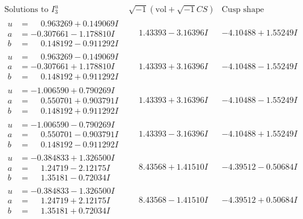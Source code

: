 \documentclass[1p]{elsarticle_modified}
\theoremstyle{definition}
\newcommand{\I}{\sqrt{-1}}
\begin{document}
$$\begin{array}{c|c|c}  
\text{Solutions to }I^u_{3}& \I (\text{vol} + \sqrt{-1}CS) & \text{Cusp shape}\\
 \hline 
\begin{aligned}
u &= \phantom{-}0.963269 + 0.149069 I \\
a &= -0.307661 - 1.178810 I \\
b &= \phantom{-}0.148192 - 0.911292 I\end{aligned}
 & \phantom{-}1.43393 - 3.16396 I & -4.10488 + 1.55249 I \\ \hline\begin{aligned}
u &= \phantom{-}0.963269 - 0.149069 I \\
a &= -0.307661 + 1.178810 I \\
b &= \phantom{-}0.148192 + 0.911292 I\end{aligned}
 & \phantom{-}1.43393 + 3.16396 I & -4.10488 - 1.55249 I \\ \hline\begin{aligned}
u &= -1.006590 + 0.790269 I \\
a &= \phantom{-}0.550701 + 0.903791 I \\
b &= \phantom{-}0.148192 + 0.911292 I\end{aligned}
 & \phantom{-}1.43393 + 3.16396 I & -4.10488 - 1.55249 I \\ \hline\begin{aligned}
u &= -1.006590 - 0.790269 I \\
a &= \phantom{-}0.550701 - 0.903791 I \\
b &= \phantom{-}0.148192 - 0.911292 I\end{aligned}
 & \phantom{-}1.43393 - 3.16396 I & -4.10488 + 1.55249 I \\ \hline\begin{aligned}
u &= -0.384833 + 1.326500 I \\
a &= \phantom{-}1.24719 - 2.12175 I \\
b &= \phantom{-}1.35181 - 0.72034 I\end{aligned}
 & \phantom{-}8.43568 + 1.41510 I & -4.39512 - 0.50684 I \\ \hline\begin{aligned}
u &= -0.384833 - 1.326500 I \\
a &= \phantom{-}1.24719 + 2.12175 I \\
b &= \phantom{-}1.35181 + 0.72034 I\end{aligned}
 & \phantom{-}8.43568 - 1.41510 I & -4.39512 + 0.50684 I \\ \hline\begin{aligned}

\end{aligned}
\end{array}$$
\end{document}
